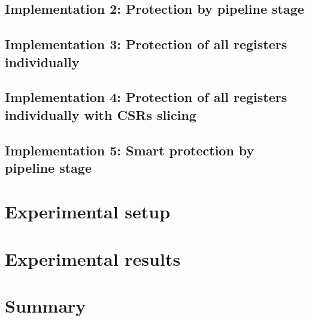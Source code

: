     \subsection{Implementation 2: Protection by pipeline stage}

    \subsection{Implementation 3: Protection of all registers individually}

    \subsection{Implementation 4: Protection of all registers individually with CSRs slicing}

    \subsection{Implementation 5: Smart protection by pipeline stage}


\section{Experimental setup}
\label{section:setup}

\section{Experimental results}
\label{section:results}

\section{Summary}

